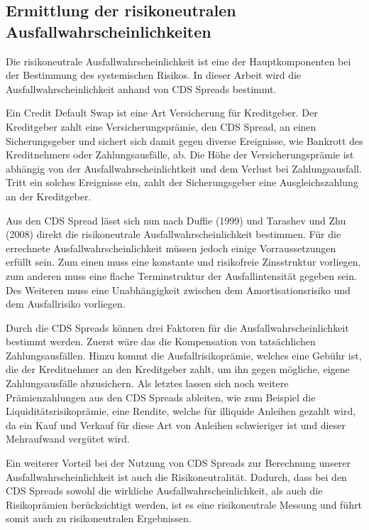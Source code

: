 \documentclass[a4paper,12pt]{scrartcl}
\begin{document}
\subsection{Ermittlung der risikoneutralen Ausfallwahrscheinlichkeiten}
Die risikoneutrale Ausfallwahrscheinlichkeit ist eine der Hauptkomponenten bei der Bestimmung des systemischen Risikos. In dieser Arbeit wird die Ausfallwahrscheinlichkeit anhand von CDS Spreads bestimmt.

Ein Credit Default Swap ist eine Art Versicherung für Kreditgeber. Der Kreditgeber zahlt eine Versicherungsprämie, den CDS Spread, an einen Sicherungsgeber und sichert sich damit gegen diverse Ereignisse, wie Bankrott des Kreditnehmers oder Zahlungsausfälle, ab. Die Höhe der Versicherungsprämie ist abhängig von der Ausfallwahrscheinlichtkeit und dem Verlust bei Zahlungsausfall.  Tritt ein solches Ereignisse ein, zahlt der Sicherungsgeber eine Ausgleichszahlung an der Kreditgeber.

Aus den CDS Spread lässt sich nun nach Duffie (1999) und Tarashev und Zhu (2008) direkt die risikoneutrale Ausfallwahrscheinlichkeit bestimmen. Für die errechnete Ausfallwahrscheinlichkeit müssen jedoch einige Vorraussetzungen erfüllt sein. Zum einen muss eine konstante und risikofreie Zinsstruktur vorliegen, zum anderen muss eine flache Terminstruktur der Ausfallintensität gegeben sein. Des Weiteren muss eine Unabhängigkeit zwischen dem Amortisationsrisiko und dem Ausfallrisiko vorliegen. 

Durch die CDS Spreads können drei Faktoren für die Ausfallwahrscheinlichkeit bestimmt werden. Zuerst wäre das die Kompensation von tatsächlichen Zahlungsausfällen. Hinzu kommt die Ausfallrisikoprämie, welches eine Gebühr ist, die der Kreditnehmer an den Kreditgeber zahlt, um ihn gegen mögliche, eigene Zahlungsausfälle abzusichern. Als letztes lassen sich noch weitere Prämienzahlungen aus den CDS Spreads ableiten, wie zum Beispiel die Liquiditätsrisikoprämie, eine Rendite, welche für illiquide Anleihen gezahlt wird, da ein Kauf und Verkauf für diese Art von Anleihen schwieriger ist und dieser Mehraufwand vergütet wird.

Ein weiterer Vorteil bei der Nutzung von CDS Spreads zur Berechnung unserer Ausfallwahrscheinlichkeit ist auch die Risikoneutralität. Dadurch, dass bei den CDS Spreads sowohl die wirkliche Ausfallwahrscheinlichkeit, als auch die Risikoprämien berücksichtigt werden, ist es eine risikoneutrale Messung und führt somit auch zu risikoneutralen Ergebnissen.
\end{document}
